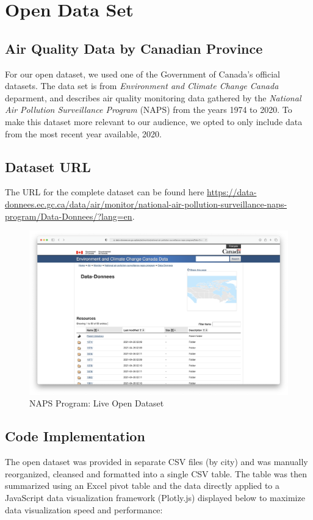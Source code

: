 \documentclass[12pt, letterpaper]{article}
\begin{document}
\section{Open Data Set}

\subsection*{Air Quality Data by Canadian Province}
For our open dataset, we used one of the Government of Canada's official datasets. The data set is from \textit{Environment and Climate Change Canada} deparment, and describes air quality monitoring data gathered by the \textit{National Air Pollution Surveillance Program} (NAPS) from the years 1974 to 2020. To make this dataset more relevant to our audience, we opted to only include data from the most recent year available, 2020.

\subsection*{Dataset URL}
The URL for the complete dataset can be found here \url{https://data-donnees.ec.gc.ca/data/air/monitor/national-air-pollution-surveillance-naps-program/Data-Donnees/?lang=en}.

\begin{figure}[htbp]
	\centering
	\includegraphics[width=\textwidth]{images/21-1-opendataset.png}
	\caption{NAPS Program: Live Open Dataset}
 \end{figure}

\newpage

\subsection*{Code Implementation}
The open dataset was provided in separate CSV files (by city) and was manually reorganized, cleansed and formatted into a single CSV table. The table was then summarized using an Excel pivot table and the data directly applied to a JavaScript data visualization framework (Plotly.js) displayed below to maximize data visualization speed and performance:
\end{document}
